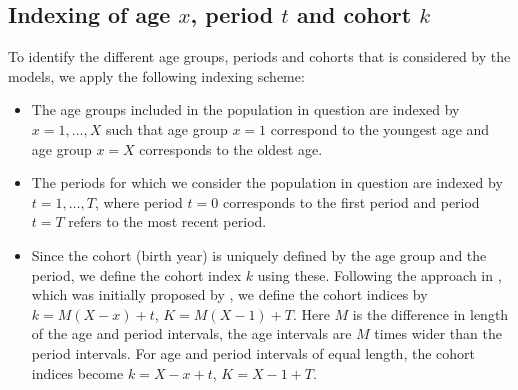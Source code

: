 \subsection{Indexing of age $x$, period $t$ and cohort $k$}
To identify the different age groups, periods and cohorts that is considered by the models, we apply the following indexing scheme:
\begin{itemize}
    \item The age groups included in the population in question are indexed by $x = 1,\ldots,X$ such that age group $x=1$ correspond to the youngest age and age group $x=X$ corresponds to the oldest age.
    \item The periods for which we consider the population in question are indexed by $t=1,\ldots,T$, where period $t=0$ corresponds to the first period and period $t = T$ refers to the most recent period. 
    \item Since the cohort (birth year) is uniquely defined by the age group and the period, we define the cohort index $k$ using these. Following the approach in \cite{rieblerHeld2010}, which was initially proposed by \cite{Heuer1997}, we define the cohort indices by $k = M(X - x) + t$, $K = M(X - 1) + T$. Here $M$ is the difference in length of the age and period intervals, the age intervals are $M$ times wider than the period intervals. For age and period intervals of equal length, the cohort indices become $k = X - x + t$, $K = X - 1 + T.$
\end{itemize}


